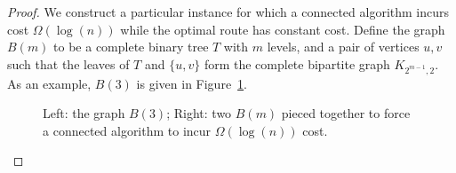 \begin{proof}

We construct a particular instance for which a connected algorithm incurs cost
$\Omega(\log(n))$ while the optimal route has constant cost. Define the graph
$B(m)$ to be a complete binary tree $T$ with $m$ levels, and a pair of vertices
$u,v$ such that the leaves of $T$ and $\{u,v\}$ form the complete bipartite
graph $K_{2^{m-1}, 2}$. As an example, $B(3)$ is given in Figure~\ref{fig:b3}.

\begin{figure}[th]
\centering
\begin{subfigure}{.5\textwidth}
  \centering
\end{subfigure}%
\begin{subfigure}{.5\textwidth}
  \centering
\end{subfigure}
\caption{Left: the graph $B(3)$; Right: two $B(m)$ pieced together to force a
connected algorithm to incur $\Omega(\log(n))$ cost.}
\label{fig:b3}
\end{figure}


\end{proof}
